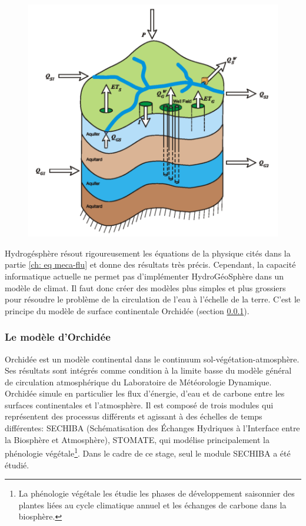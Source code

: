 \documentclass[a4paper,11pt]{article}
\numberwithin{equation}{section}
\begin{document}
\begin{figure}[H]
	\begin{center}
		\includegraphics[scale=0.35]{HGS_modele.png}
	\end{center}
	\label{fig-HGS_water_balance}
\end{figure}

Hydrogésphère résout rigoureusement les équations de la physique cités dans la partie \ref{ch: eq meca-flu} et donne des résultats très précis. Cependant, la capacité informatique actuelle ne permet pas d'implémenter HydroGéoSphère dans un modèle de climat. Il faut donc créer des modèles plus simples et plus grossiers pour résoudre le problème de la circulation de l'eau à l'échelle de la terre. C'est le principe du modèle de surface continentale Orchidée (section \ref{ch:Orchidee}).

\subsubsection{Le modèle d'Orchidée}
\label{ch:Orchidee}
Orchidée est un modèle continental dans le continuum sol-végétation-atmosphère. Ses résultats sont intégrés comme condition à la limite basse du modèle général de circulation atmosphérique du Laboratoire de Météorologie Dynamique. Orchidée simule en particulier les flux d’énergie, d’eau et de carbone entre les surfaces continentales et l’atmosphère. Il est composé de trois modules qui représentent des processus différents et agissant à des échelles de temps différentes: SECHIBA (Schématisation des Échanges Hydriques à l’Interface entre la Biosphère et Atmosphère), STOMATE, qui modélise principalement la phénologie végétale\footnote{La phénologie végétale les étudie les phases de développement saisonnier des plantes liées au cycle climatique annuel et les échanges de carbone dans la biosphère.}. Dans le cadre de ce stage, seul le module SECHIBA a été étudié.
\end{document}
